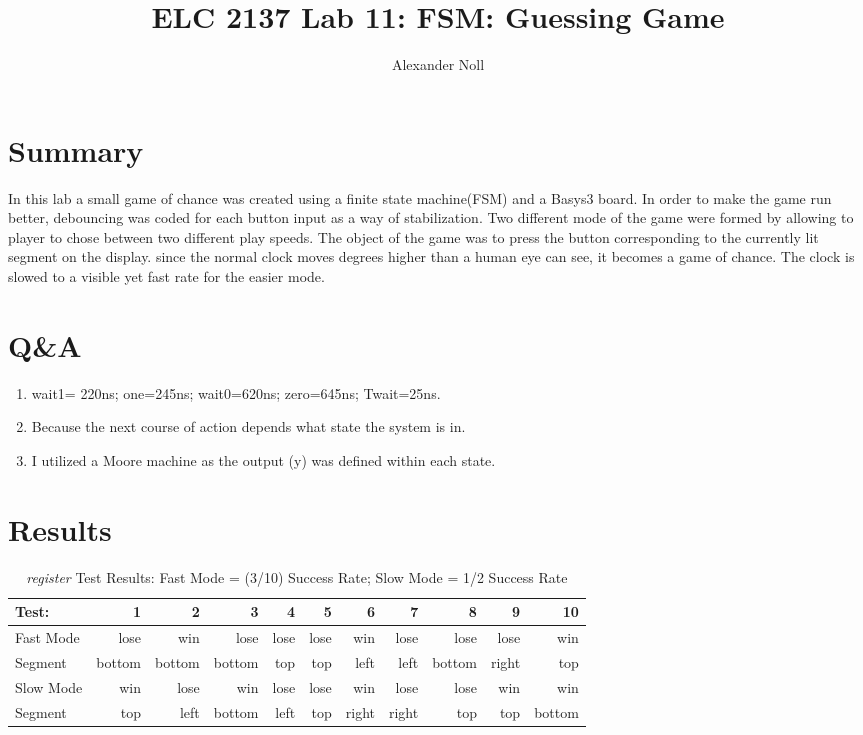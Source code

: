 \documentclass[11pt]{article}
\begin{document}
\title{ELC 2137 Lab 11: FSM: Guessing Game}
\author{Alexander Noll}

\maketitle


\section*{Summary}

In this lab a small game of chance was created using a finite state machine(FSM) and a Basys3 board. In order to make the game run better, debouncing was coded for each button input as a way of stabilization. Two different mode of the game were formed by allowing to player to chose between two different play speeds. The object of the game was to press the button corresponding to the currently lit segment on the display. since the normal clock moves degrees higher than a human eye can see, it becomes a game of chance. The clock is slowed to a visible yet fast rate for the easier mode.


\section*{Q\&A}
\begin{enumerate}
	\item wait1= 220ns; one=245ns; wait0=620ns; zero=645ns; Twait=25ns.
	\item Because the next course of action depends what state the system is in.
	\item I utilized a Moore machine as the output (y) was defined within each state.
\end{enumerate}



\clearpage

\section*{Results}

\begin{table}[ht]\centering
	\caption{\textit{register} Test Results: Fast Mode = (3/10) Success Rate; Slow Mode = 1/2 Success Rate }
	\label{TestResult}\medskip
	\begin{tabular}{l|rrrrrrrrrr}
		Test: 		& 1 & 2 & 3 & 4 & 5 & 6 & 7 & 8 & 9 & 10 \\
		\midrule
		Fast Mode   & lose & win & lose & lose  & lose & win & lose & lose & lose & win \\
		Segment   & bottom & bottom & bottom & top & top & left & left & bottom & right & top \\
		Slow Mode  	& win & lose & win & lose & lose & win & lose & lose & win & win \\
		Segment   & top & left & bottom & left & top & right & right & top & top & bottom \\
		\bottomrule
	\end{tabular}
\end{table}
\end{document}
